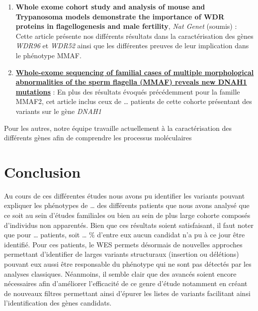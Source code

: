 \documentclass[12pt,twoside]{reedthesis}
\theoremstyle{definition}
\theoremstyle{definition}
\theoremstyle{remark}
\begin{document}
  \begin{enumerate}
  \def\labelenumi{\arabic{enumi}.}
  \item
    \textbf{Whole exome cohort study and analysis of mouse and Trypanosoma
    models demonstrate the importance of WDR proteins in flagellogenesis
    and male fertility}, \emph{Nat Genet} (soumis) : Cette article
    présente nos différents résultats dans la caractérisation des gènes
    \emph{WDR96} et \emph{WDR52} ainsi que les différentes preuves de leur
    implication dans le phénotype MMAF.
  \item
    \protect\hyperlink{famdnah1}{\textbf{Whole-exome sequencing of
    familial cases of multiple morphological abnormalities of the sperm
    flagella (MMAF) reveals new DNAH1 mutations}} : En plus des résultats
    évoqués précédemment pour la famille MMAF2, cet article inclus ceux de
    \ldots{} patients de cette cohorte présentant des variants sur le gène
    \emph{DNAH1}
  \end{enumerate}
  
  Pour les autres, notre équipe travaille actuellement à la
  caractérisation des différents gènes afin de comprendre les processus
  moléculaires
  
  \newpage
  
  \newpage
  
  \newpage 
  
  \section{Conclusion}\label{conclusion}
  
  Au cours de ces différentes études nous avons pu identifier les variants
  pouvant expliquer les phénotypes de \ldots{} des différents patients que
  nous avons analysé que ce soit au sein d'études familiales ou bien au
  sein de plus large cohorte composés d'individus non apparentés. Bien que
  ces résultats soient satisfaisant, il faut noter que pour \ldots{}
  patients, soit \ldots{} \% d'entre eux aucun candidat n'a pu à ce jour
  être identifié. Pour ces patients, le WES permets désormais de nouvelles
  approches permettant d'identifier de larges variants structuraux
  (insertion ou délétions) pouvant eux aussi être responsable du phénotype
  qui ne sont pas détectés par les analyses classiques. Néanmoins, il
  semble clair que des avancés soient encore nécessaires afin d'améliorer
  l'efficacité de ce genre d'étude notamment en créant de nouveaux filtres
  permettant ainsi d'épurer les listes de variants facilitant ainsi
  l'identification des gènes candidats.
  
\end{document}
